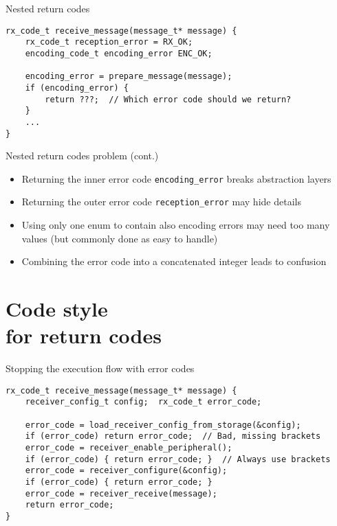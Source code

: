 \documentclass[aspectratio=169,14pt]{beamer}
\begin{document}
\begin{frame}[fragile]{Nested return codes }
\begin{lstlisting}[style=cstyle]
rx_code_t receive_message(message_t* message) {
    rx_code_t reception_error = RX_OK;
    encoding_code_t encoding_error ENC_OK;
    
    encoding_error = prepare_message(message);
    if (encoding_error) {
        return ???;  // Which error code should we return?
    }
    ...
}
\end{lstlisting}
\end{frame}



\begin{frame}{Nested return codes problem (cont.)}
\begin{itemize}
    \item Returning the inner error code \texttt{encoding\_error} breaks abstraction layers
    \item Returning the outer error code \texttt{reception\_error} may hide details
    \item Using only one enum to contain also encoding errors may need too many values (but commonly done as easy to handle)
    \item Combining the error code into a concatenated integer leads to confusion
\end{itemize}
\end{frame}





\section{Code style\\ for return codes}

\begin{frame}[fragile]{Stopping the execution flow with error codes}
\begin{lstlisting}[style=cstyle]
rx_code_t receive_message(message_t* message) {
    receiver_config_t config;  rx_code_t error_code;
    
    error_code = load_receiver_config_from_storage(&config);
    if (error_code) return error_code;  // Bad, missing brackets
    error_code = receiver_enable_peripheral();
    if (error_code) { return error_code; }  // Always use brackets
    error_code = receiver_configure(&config);
    if (error_code) { return error_code; }
    error_code = receiver_receive(message);
    return error_code;
}
\end{lstlisting}
\end{frame}
\end{document}
